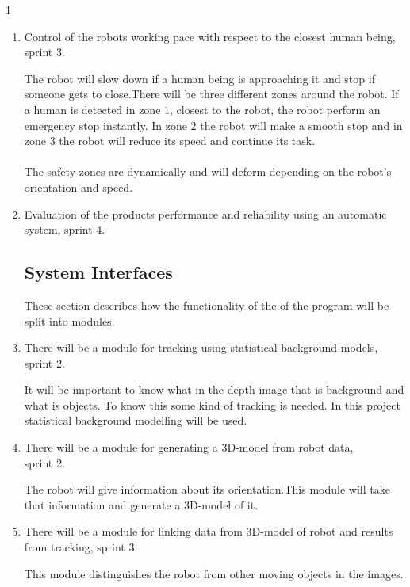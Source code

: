 1\documentclass[10pt,a4paper]{article}
\begin{document}
\begin{enumerate}
\item Control of the robots working pace with respect to the closest human being, sprint 3.

{\addtolength{\leftskip}{5mm}The robot will slow down if a human being is approaching it and stop if someone gets to close.There will be three different zones around the robot. If a human is detected in zone 1, closest to the robot, the robot perform an emergency stop instantly. In zone 2 the robot will make a smooth stop and in zone 3 the robot will reduce its speed and continue its task.
\\\\The safety zones are dynamically and will deform depending on the robot's orientation and speed. \par}

\item Evaluation of the products performance and reliability using an automatic system, sprint 4.

\subsection{System Interfaces}
These section describes how the functionality of the of the program will be split into modules.

\item There will be a module for tracking using statistical background models, sprint 2.

{\addtolength{\leftskip}{5mm}It will be important to know what in the depth image that is background and what is objects. To know this some kind of tracking is needed. In this project statistical background modelling will be used.\par}
\item There will be a module for generating a 3D-model from robot data,\\ sprint 2.
 
{\addtolength{\leftskip}{5mm}The robot will give information about its orientation.This module will take that information and generate a 3D-model of it.\par}
 
 \item There will be a module for linking data from 3D-model of robot and results from tracking, sprint 3.

{\addtolength{\leftskip}{5mm}This module distinguishes the robot from other moving objects in the images.\par}


\end{enumerate}
\end{document}
